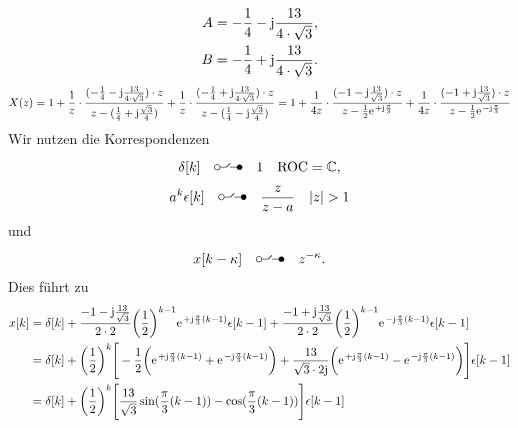 \documentclass[11pt,a4paper,DIV=12]{scrartcl}
\renewcommand{\ztransf}{\mbox{\setlength{\unitlength}{0.1em}%
                            \begin{picture}(20,10)%
                              \put(2,3){\circle{4}}%
                              \put(4,3){\line(1,0){4.75}}%
                              \multiput(8.625,3.15)(0.25,0.25){11}{%
                                \makebox(0,0){\rmfamily\tiny .}}%
                              \put(17,3){\line(-1,0){5.75}}%
                              \put(18,3){\circle*{4}}%
                            \end{picture}%
                           }
                      }
\begin{document}
\begin{align}
	A=-\frac{1}{4}-\im\frac{13}{4\cdot\sqrt{3}}, \nonumber \\
	B=-\frac{1}{4}+\im\frac{13}{4\cdot\sqrt{3}}.
\end{align}
\begin{align}
	X(z)=1+\frac{1}{z}\cdot\frac{(-\frac{1}{4}-\im\frac{13}{4\cdot\sqrt{3}})\cdot z}{z-(\frac{1}{4}+\im\frac{\sqrt{3}}{4})}+\frac{1}{z}\cdot\frac{(-\frac{1}{4}+\im\frac{13}{4\cdot\sqrt{3}})\cdot z}{z-(\frac{1}{4}-\im\frac{\sqrt{3}}{4})}=1+\frac{1}{4z}\cdot\frac{(-1-\im\frac{13}{\sqrt{3}})\cdot z}{z-\frac{1}{2}\e^{+\im\frac{\pi}{3}}}+\frac{1}{4z}\cdot\frac{(-1+\im\frac{13}{\sqrt{3}})\cdot z}{z-\frac{1}{2}\e^{-\im\frac{\pi}{3}}}
\end{align}
Wir nutzen die Korrespondenzen
\begin{align}
	\delta[k]\quad\ztransf\quad1\quad\mathrm{ROC}=\mathbb{C},
\end{align}
\begin{align}
	a^k\epsilon[k]\quad\ztransf\quad\frac{z}{z-a}\quad|z|>1
\end{align}
und
\begin{align}
	x[k-\kappa]\quad\ztransf\quad z^{-\kappa}.
\end{align}
Dies führt zu
\begin{align}
	x[k]&=\delta[k]+\frac{-1-\im\frac{13}{\sqrt{3}}}{2\cdot2}\bigg(\frac{1}{2}\bigg)^{k-1}\e^{+\im\frac{\pi}{3}(k-1)}\epsilon[k-1]+\frac{-1+\im\frac{13}{\sqrt{3}}}{2\cdot2}\bigg(\frac{1}{2}\bigg)^{k-1}\e^{-\im\frac{\pi}{3}(k-1)}\epsilon[k-1] \nonumber\\
	&=\delta[k]+\bigg(\frac{1}{2}\bigg)^{k}\Bigg[-\frac{1}{2}\bigg(\e^{+\im\frac{\pi}{3}(k-1)}+\e^{-\im\frac{\pi}{3}(k-1)}\bigg)+\frac{13}{\sqrt{3}\cdot2\im}\bigg(\e^{+\im\frac{\pi}{3}(k-1)}-\e^{-\im\frac{\pi}{3}(k-1)}\bigg)\Bigg ]\epsilon[k-1]\nonumber\\
	&=\delta[k]+\bigg(\frac{1}{2}\bigg)^k\Bigg[\frac{13}{\sqrt{3}}\sin(\frac{\pi}{3}(k-1))-\cos(\frac{\pi}{3}(k-1))\Bigg]\epsilon[k-1]
\end{align}

\end{document}
